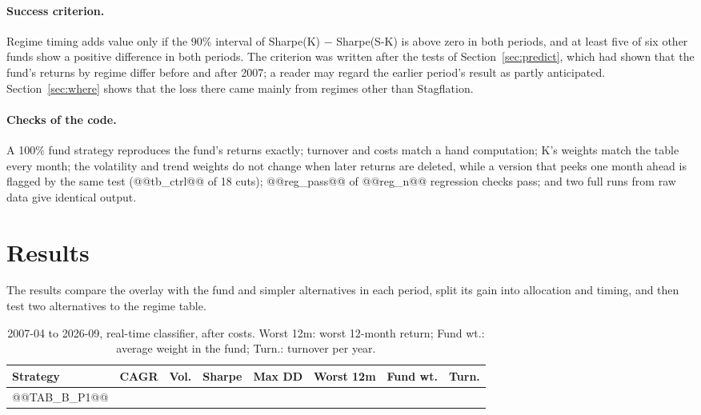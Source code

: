 \documentclass[11pt,a4paper]{article}
\begin{document}
\paragraph{Success criterion.} Regime timing adds value only if the 90\% interval of Sharpe(K) $-$ Sharpe(S-K) is
above zero in both periods, and at least five of six other funds show a positive difference in both periods.
The criterion was written after the tests of Section~\ref{sec:predict}, which had shown that the fund's
returns by regime differ before and after 2007; a reader may regard the earlier period's result as partly
anticipated. Section~\ref{sec:where} shows that the loss there came mainly from regimes other than Stagflation.

\paragraph{Checks of the code.} A 100\% fund strategy reproduces the fund's returns exactly; turnover and costs
match a hand computation; K's weights match the table every month; the volatility and trend weights do not
change when later returns are deleted, while a version that peeks one month ahead is flagged by the same test
(@@tb_ctrl@@ of 18 cuts); @@reg_pass@@ of @@reg_n@@ regression checks pass; and two full runs from raw data give
identical output.

\section{Results}
\label{sec:results}

The results compare the overlay with the fund and simpler alternatives in each period, split its gain into allocation and timing, and then test two alternatives to the regime table.


\begin{table}[htbp]
\centering
\caption{2007-04 to 2026-09, real-time classifier, after costs. Worst 12m: worst 12-month return; Fund wt.:
average weight in the fund; Turn.: turnover per year.}
\label{tab:p1}
\small
\setlength{\tabcolsep}{4pt}
\begin{tabular}{@{}lrrrrrrr@{}}
\toprule
Strategy & CAGR & Vol. & Sharpe & Max DD & Worst 12m & Fund wt. & Turn. \\
\midrule
@@TAB_B_P1@@
\bottomrule
\end{tabular}
\end{table}
\end{document}
